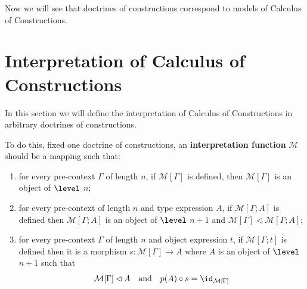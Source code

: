 Now we will see that doctrines of constructions correspond to models of Calculus of Constructions.

\section{Interpretation of Calculus of Constructions}

In this section we will define the interpretation of Calculus of Constructions in arbitrary
doctrines of constructions. 

To do this, fixed one doctrine of constructions, an \textbf{interpretation function} $\mathcal{M}$ should be a
mapping such that:
\begin{enumerate}
    \item for every pre-context $\Gamma$ of length $n$, if $\mathcal{M}[\Gamma]$ is defined, then 
          $\mathcal{M}[\Gamma]$ is an object of $\level$ $n$;
    \item for every pre-context of length $n$ and type expression $A$, 
          if $\mathcal{M}[\Gamma ; A]$ is defined then $\mathcal{M}[\Gamma ; A]$ is an object 
          of $\level$ $n + 1$ and $\mathcal{M}[\Gamma] \lhd \mathcal{M}[\Gamma; A]$; 
    \item for every pre-context $\Gamma$ of length $n$ and object expression $t$, 
          if $\mathcal{M}[\Gamma; t]$ is defined then it is a morphism $s : \mathcal{M}[\Gamma] \to A$
          where $A$ is an object of $\level$ $n + 1$ such that \[
          \mathcal{M}[\Gamma] \lhd A \quad \text{and} \quad p(A) \circ s = \id_{\mathcal{M}[\Gamma]}
          \]
\end{enumerate} 

